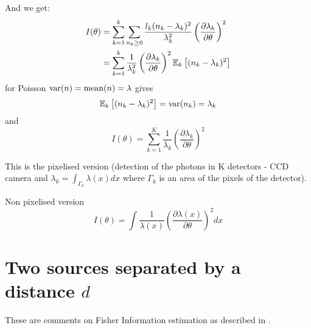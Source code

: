 And we get:
%
\begin{align*}
	I(\theta) 
	& =\sum_{k=1}^k\sum_{n_k\geq0}\frac{l_k(n_k-\lambda_k)^2}{\lambda_k^2}\left(\frac{\partial\lambda_k}{\partial\theta}\right)^2\\
	& =\sum_{k=1}^k\frac{1}{\lambda_k^2}\left(\frac{\partial\lambda_k}{\partial\theta}\right)^2\mathbb{E}_k\left[(n_k-\lambda_k)^2\right]
\end{align*}
%
for Poisson $\mathrm{var}(n)=\mathrm{mean}(n)=\lambda$ gives 
%
\begin{equation}
	\mathbb{E}_k\left[(n_k-\lambda_k)^2\right]=\mathrm{var}(n_k)=\lambda_k
\end{equation}
%
and 
%
\begin{equation}
	I(\theta)=\sum_{k=1}^K\frac{1}{\lambda_k}\left(\frac{\partial\lambda_k}{\partial\theta}\right)^2
	\label{eq:app-Fisher Info for Poisson}   	  
\end{equation}

This is the pixelised version (detection of the photons in K detectors - CCD camera and $\lambda_k=\int_{\Gamma_k}\lambda(x)dx$ where $\Gamma_k$ is an area of the pixels of the detector). 

Non pixelised version \cite{Ram2006}
%
\begin{equation}
	I(\theta)=\int\frac{1}{\lambda(x)}\left(\frac{\partial\lambda(x)}{\partial\theta}\right)^2dx
\end{equation}

\clearpage{}
\section{Two sources separated by a distance $d$\label{sub:Two-sources-separated}}

These are comments on Fisher Information estimation as described in \cite{Ram2006}.

